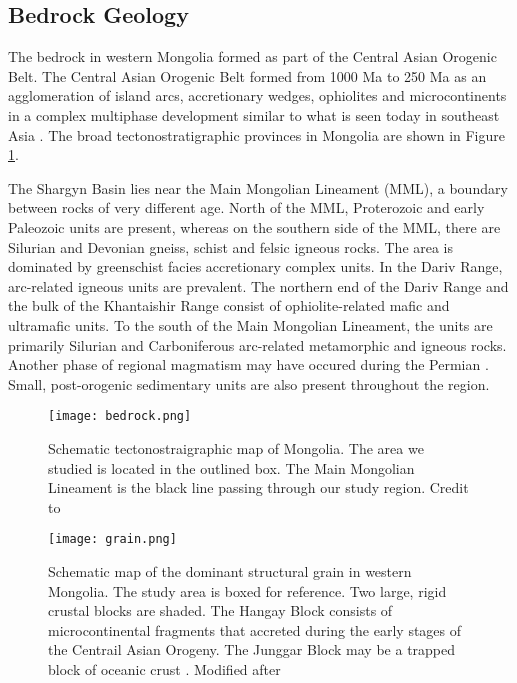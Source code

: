 \documentclass[10pt,a4paper]{article}
\begin{document}
\subsection{Bedrock Geology}
The bedrock in western Mongolia formed as part of the Central Asian Orogenic Belt. The Central Asian Orogenic Belt formed from 1000 Ma to 250 Ma as an agglomeration of island arcs, accretionary wedges, ophiolites and microcontinents in a complex multiphase development similar to what is seen today in southeast Asia \citep{Windley2007}. The broad tectonostratigraphic provinces in Mongolia are shown in Figure \ref{bedrock}.

The Shargyn Basin lies near the Main Mongolian Lineament (MML), a boundary between rocks of very different age. North of the MML, Proterozoic and early Paleozoic units are present, whereas on the southern side of the MML, there are Silurian and Devonian gneiss, schist and felsic igneous rocks. The area is dominated by greenschist facies accretionary complex units. In the Dariv Range, arc-related igneous units are prevalent. The northern end of the Dariv Range and the bulk of the Khantaishir Range consist of ophiolite-related mafic and ultramafic units. To the south of the Main Mongolian Lineament, the units are primarily Silurian and Carboniferous arc-related metamorphic and igneous rocks. Another phase of regional magmatism may have occured during the Permian \citep{Windley2007}. Small, post-orogenic sedimentary units are also present throughout the region.

\begin{figure}[h!]
  \centering
  \texttt{[image: bedrock.png]}
  \caption{Schematic tectonostraigraphic map of Mongolia. The area we studied is located in the outlined box. The Main Mongolian Lineament is the black line passing through our study region. Credit to \citet{Windley2007}}
  \label{bedrock}
\end{figure}

\begin{figure}[h!]
  \centering
  \texttt{[image: grain.png]}
  \caption{Schematic map of the dominant structural grain in western Mongolia. The study area is boxed for reference. Two large, rigid crustal blocks are shaded. The Hangay Block consists of microcontinental fragments that accreted during the early stages of the Centrail Asian Orogeny. The Junggar Block may be a trapped block of oceanic crust \citep{Carroll1990a}. Modified after \citet{Cunningham2005a}}
  \label{grain}
\end{figure}
\end{document}
